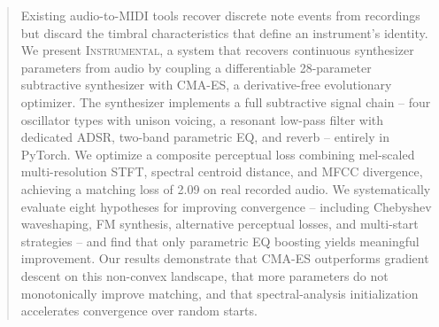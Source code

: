 \begin{abstract}
Existing audio-to-MIDI tools recover discrete note events from recordings but discard the timbral characteristics that define an instrument's identity.
We present \textsc{Instrumental}, a system that recovers continuous synthesizer parameters from audio by coupling a differentiable 28-parameter subtractive synthesizer with CMA-ES, a derivative-free evolutionary optimizer.
The synthesizer implements a full subtractive signal chain -- four oscillator types with unison voicing, a resonant low-pass filter with dedicated ADSR, two-band parametric EQ, and reverb -- entirely in PyTorch.
We optimize a composite perceptual loss combining mel-scaled multi-resolution STFT, spectral centroid distance, and MFCC divergence, achieving a matching loss of 2.09 on real recorded audio.
We systematically evaluate eight hypotheses for improving convergence -- including Chebyshev waveshaping, FM synthesis, alternative perceptual losses, and multi-start strategies -- and find that only parametric EQ boosting yields meaningful improvement.
Our results demonstrate that CMA-ES outperforms gradient descent on this non-convex landscape, that more parameters do not monotonically improve matching, and that spectral-analysis initialization accelerates convergence over random starts.
\end{abstract}
